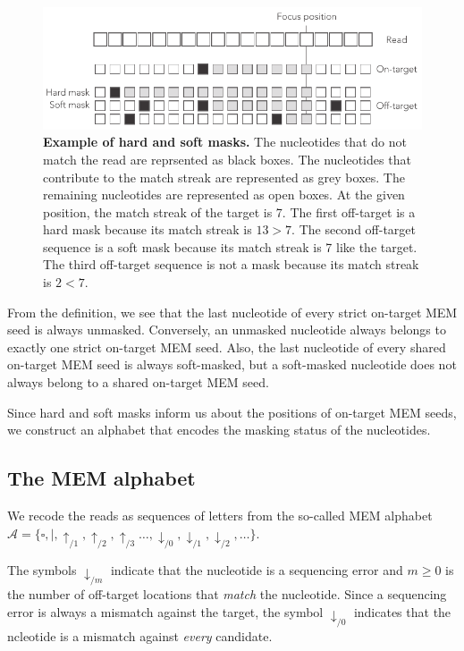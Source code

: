 \documentclass{article}
\begin{document}
\begin{figure}[h]
\centering
\includegraphics[scale=0.85]{hard_vs_soft_masks.pdf}
\caption{\textbf{Example of hard and soft masks.}
The nucleotides that do not match the read are reprsented as black boxes.
The nucleotides that contribute to the match streak are represented as
grey boxes. The remaining nucleotides are represented as open boxes. At
the given position, the match streak of the target is 7. The first
off-target is a hard mask because its match streak is $13>7$. The second
off-target sequence is a soft mask because its match streak is 7 like the
target. The third off-target sequence is not a mask because its match
streak is $2<7$.}
\label{fig:hard_vs_soft_masks}
\end{figure}

From the definition, we see that the last nucleotide of every strict
on-target MEM seed is always unmasked. Conversely, an unmasked nucleotide
always belongs to exactly one strict on-target MEM seed. Also, the last
nucleotide of every shared on-target MEM seed is always soft-masked, but a
soft-masked nucleotide does not always belong to a shared on-target MEM
seed.

Since hard and soft masks inform us about the positions of on-target
MEM seeds, we construct an alphabet that encodes the masking status of the
nucleotides.

\subsection{The MEM alphabet}

We recode the reads as sequences of letters from the so-called MEM
alphabet $\mathcal{A} = \{\square, |, \uparrow_{/1}, \uparrow_{/2},
\uparrow_{/3} \ldots, \downarrow_{/0}, \downarrow_{/1}, \downarrow_{/2},
\ldots\}$.

The symbols $\downarrow_{/m}$ indicate that the nucleotide is a sequencing
error and $m \geq 0$ is the number of off-target locations that
\emph{match} the nucleotide. Since a sequencing error is always a mismatch
against the target, the symbol $\downarrow_{/0}$ indicates that the
ncleotide is a mismatch against \emph{every} candidate.
\end{document}
